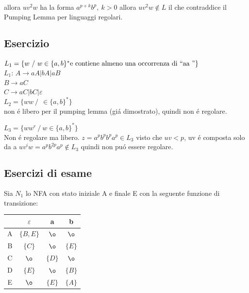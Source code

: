 allora $uv^2w$ ha la forma $a^{p+k}b^p,\ k > 0$
allora $uv^2w \not\in L$ il che contraddice il Pumping Lemma per linguaggi regolari.

\subsection{Esercizio}
$L_1 = \{ w \ / \ w \in \{ a, b \}^* \text{e contiene almeno una occorrenza di \lq\lq aa \rq\rq}\}$\\

$L_1$:
$A \rightarrow aA | bA | aB$\\
$B \rightarrow aC$\\
$C \rightarrow aC | bC | \varepsilon $\\

$L_2 = \{ ww \ / \ \ \in \{ a,b \}^* \}$\\
non \'e libero per il pumping lemma (gi\'a dimostrato), quindi non \'e regolare.

$L_3 = \{ww^r \ / \ w \in \{ a,b \}^* \}$\\
Non \'e regolare ma libero.
$z = a^p b^p b^p a^p \in L_3$
visto che $uv < p$, uv \'e composta solo da a 
$u v^i w = a^pb^{2p}a^p \not\in L_3$ quindi non pu\'o essere regolare.

\subsection{Esercizi di esame}
Sia $N_1$ lo NFA con stato iniziale A e finale E con la seguente funzione di transizione:

\begin{center}
    \begin{tabular}{|c|c|c|c|}
        \hline
            &   $\varepsilon$      &   a           &   b           \\
        \hline
            A    &   $\{B, E\}$ &   $\o$        &  $\o$         \\
        \hline
            B    &   $\{ C \}$  &   $\o$        &  $\{ E \}$    \\
        \hline
            C    &   $\o$       &   $\{ D \}$   &  $\o$         \\
        \hline
            D    &   $\{ E \}$  &   $\o$        &  $\{ B \}$    \\
        \hline
            E    &   $\o$       &    $\{ E \}$  &  $\{ A \}$    \\
        \hline
    \end{tabular}
\end{center} 

